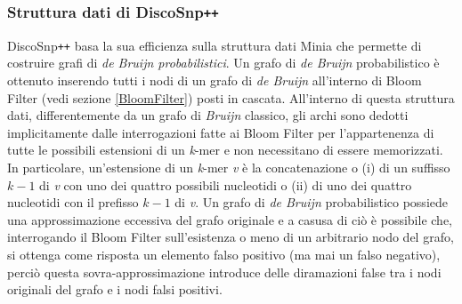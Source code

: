\documentclass[../main.tex]{subfiles}
\begin{document}


\subsubsection{Struttura dati di DiscoSnp\texttt{++}}

DiscoSnp\texttt{++} basa la sua efficienza sulla struttura dati Minia \cite{chikhi2013space} che permette di costruire grafi di \textit{de Bruijn probabilistici}. Un grafo di \textit{de Bruijn} probabilistico è ottenuto inserendo tutti i nodi di un grafo di \textit{de Bruijn} all'interno di Bloom Filter (vedi sezione \ref{BloomFilter}) posti in cascata. All'interno di questa struttura dati, differentemente da un grafo di \textit{Bruijn} classico, gli archi sono dedotti implicitamente dalle interrogazioni fatte ai Bloom Filter per l'appartenenza di tutte le possibili estensioni di un \textit{k}-mer e non necessitano di essere memorizzati. In particolare, un'estensione di un \textit{k}-mer \textit{v} è la concatenazione o (i) di un suffisso $k-1$ di \textit{v} con uno dei quattro possibili nucleotidi o (ii) di uno dei quattro nucleotidi con il prefisso  $k-1$ di \textit{v}. Un grafo di \textit{de Bruijn} probabilistico possiede una approssimazione eccessiva del grafo originale e a casusa di ciò è possibile che, interrogando il Bloom Filter sull'esistenza o meno di un arbitrario nodo del grafo, si ottenga come risposta un elemento falso positivo (ma mai un falso negativo), perciò questa sovra-approssimazione introduce delle diramazioni false tra i nodi originali del grafo e i nodi falsi positivi.
\end{document}
